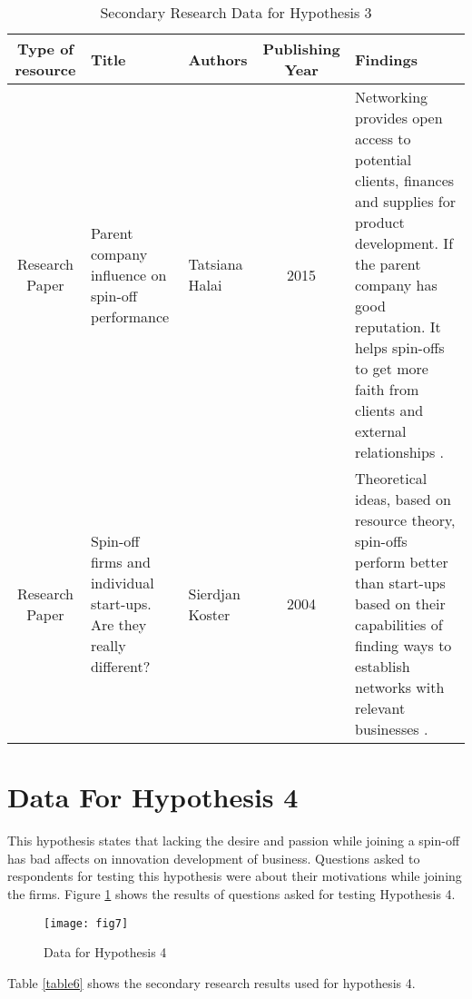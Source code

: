\begin{table} [h!]
	\centering
	\hspace*{-1cm}
	\begin{tabular}{ |c|L{3cm}|L{3cm}|c|L{3cm}| } 
		\hline
		\textbf{Type of resource} & \textbf{Title} & \textbf{Authors} & \textbf{Publishing Year} & \textbf{Findings} \\
		\hline
		Research Paper & Parent company influence on spin-off performance & Tatsiana Halai & 2015 & Networking provides open
		access to potential clients,
		finances and supplies for product development. If the parent company has good
		reputation. It helps spin-offs to
		get more faith from clients
		and external relationships \cite{58}.\\
		\hline
		Research Paper & Spin-off
		firms
		and
		individual
		start-ups.
		Are
		they really
		different? &  Sierdjan Koster & 2004 & Theoretical ideas, based on
		resource theory, spin-offs
		perform better than start-ups
		based on their capabilities of
		finding ways to establish
		networks
		with
		relevant
		businesses \cite{30}. \\
		\hline
	\end{tabular}
	\hspace*{-1cm}
	\caption{Secondary Research Data for Hypothesis 3}
	\label{table5}
\end{table}
\section{Data For Hypothesis 4\label{sec:data4}}
This hypothesis states that lacking the desire and passion while joining a spin-off has bad affects on
innovation development of business. Questions asked to respondents for testing this hypothesis
were about their motivations while joining the firms. Figure \ref{fig7} shows the results of
questions asked for testing Hypothesis 4.

\begin{figure}[!h]
	\centering
	\texttt{[image: fig7]}
	\caption{Data for Hypothesis 4}
	\label{fig7}
\end{figure}
Table \ref{table6} shows the secondary research results used for hypothesis 4.

